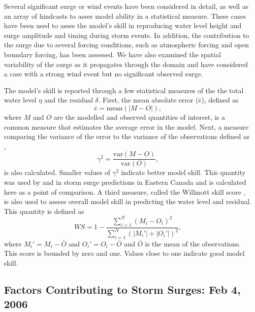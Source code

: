\documentclass[pdftex,10pt]{article}
\begin{document}
Several significant surge or wind events have been considered in detail, as well as an array of hindcasts to asses model ability in a statistical measure. These cases have been used to asses the model's skill in reproducing water level height and surge amplitude and timing during storm events. In addition, the contribution to the surge due to several forcing conditions, such as atmospheric forcing and open boundary forcing, has been assessed. We have also examined the spatial variability of the surge as it propagates through the domain and have considered a case with a strong wind event but no significant observed surge.  

The model's skill is reported through a few statistical measures of the the total water level $\eta$ and the residual $\delta$. First, the mean absolute error ($\bar{e}$), defined as
\begin{equation}
\bar{e} = \text{mean}\left(\left| M - O \right|\right),
\end{equation}
where $M$ and $O$ are the modelled and observed quantities of interest, is a common measure that estimates the average error in the model. Next, a measure comparing the variance of the error to the variance of the observations defined as \citep{thompson2003prediction},
\begin{equation}
\gamma^2 = \frac{\text{var}\left(M-O\right)}{\text{var}\left(O\right)},
\end{equation}
is also calculated. Smaller values of $\gamma^2$ indicate better model skill. This quantity was used by \citet{bernier2006predicting} and \citet{bernier2010tide} in storm surge predictions in Eastern Canada and is calculated here as a point of comparison. A third measure, called the Willmott skill score \citep{willmott1982some}, is also used to assess overall model skill in predicting the water level and residual. This quantity is defined as
\begin{equation}
WS = 1 - \frac{\sum_{i=1}^N \left(M_i - O_i\right)^2}{\sum_{i=1}^N \left(|M_i'| + |O_i'|\right)^2},
\end{equation} 
where $M_i' = M_i-\bar{O}$ and $O_i'=O_i-\bar{O}$ and $\bar{O}$ is the mean of the observations. This score is bounded by zero and one. Values close to one indicate good model skill. 


\subsection{Factors Contributing to Storm Surges: Feb 4, 2006}
\end{document}
